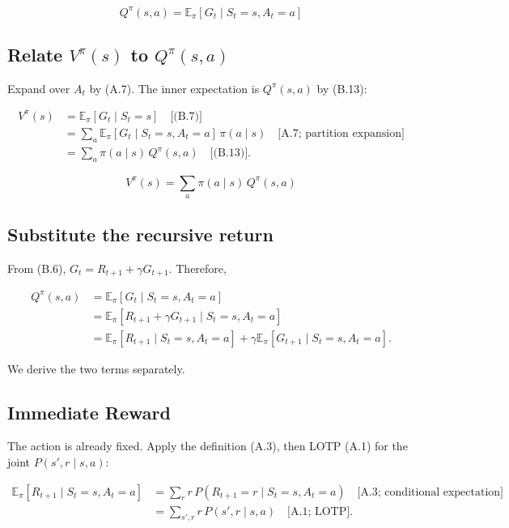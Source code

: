 \begin{equation}
Q^\pi(s,a)
=
\mathbb{E}_\pi[G_t\mid S_t=s,A_t=a]
\tag{B.13}
\end{equation}

\subsection{Relate $V^\pi(s)$ to $Q^\pi(s,a)$}

Expand over $A_t$ by (A.7). The inner expectation is $Q^\pi(s,a)$ by (B.13):

\[
\begin{aligned}
V^\pi(s)
&=
\mathbb{E}_\pi[G_t\mid S_t=s]
\quad\text{[(B.7)]}
\\
&=
\sum_a
\mathbb{E}_\pi[G_t\mid S_t=s,A_t=a]
\,
\pi(a\mid s)
\quad\text{[A.7; partition expansion]}
\\
&=
\sum_a\pi(a\mid s)\, Q^\pi(s,a)
\quad\text{[(B.13)]}.
\end{aligned}
\]

\begin{equation}
\boxed{
V^\pi(s)
=
\sum_a \pi(a\mid s)\, Q^\pi(s,a)
}
\tag{B.14}\label{eq:B.14}
\end{equation}

\subsection{Substitute the recursive return}

From (B.6), $G_t=R_{t+1}+\gamma G_{t+1}$. Therefore,

\[
\begin{aligned}
Q^\pi(s,a)
&=
\mathbb{E}_\pi[G_t\mid S_t=s,A_t=a] \\
&=
\mathbb{E}_\pi[R_{t+1}+\gamma G_{t+1}\mid S_t=s,A_t=a] \\
&=
\mathbb{E}_\pi[R_{t+1}\mid S_t=s,A_t=a]
+
\gamma
\mathbb{E}_\pi[G_{t+1}\mid S_t=s,A_t=a].
\end{aligned}
\]

We derive the two terms separately.

\subsection{Immediate Reward}

The action is already fixed. Apply the definition (A.3), then LOTP (A.1) for the joint $P(s',r\mid s,a)$:

\[
\begin{aligned}
\mathbb{E}_\pi[R_{t+1}\mid S_t=s,A_t=a]
&=
\sum_r r\,
P(R_{t+1}=r\mid S_t=s,A_t=a)
\quad\text{[A.3; conditional expectation]}
\\
&=
\sum_{s',r}
r\, P(s',r\mid s,a)
\quad\text{[A.1; LOTP]}.
\end{aligned}
\]

